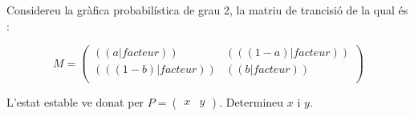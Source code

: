\exercice
Considereu la gràfica probabilística de grau 2, la matriu de trancisió de la qual és :

\[
M=\begin{pmatrix}
  (( a|facteur )) & (( (1-a)|facteur )) \\
  (( (1-b)|facteur )) & (( b|facteur )) \\
\end{pmatrix}
\]

L'estat estable ve donat per $P=\begin{pmatrix}x&y\end{pmatrix}$. Determineu $x$ i $y$.

